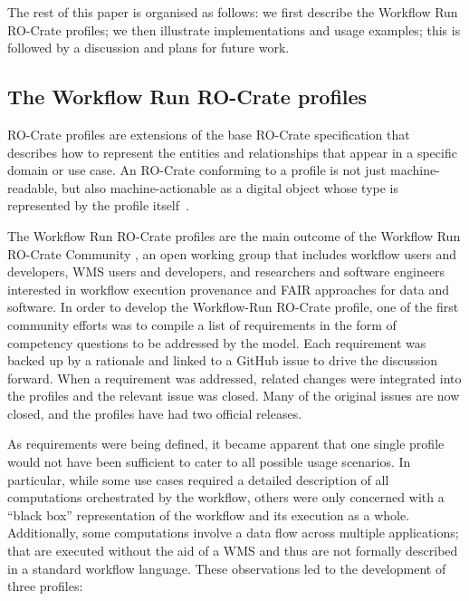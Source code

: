 The rest of this paper is organised as follows: we first describe the Workflow Run RO-Crate profiles; we then illustrate implementations and usage examples; this is followed by a discussion and plans for future work.


\subsection{The Workflow Run RO-Crate profiles}\label{ch54:the-workflow-run-ro-crate-profiles}

RO-Crate profiles are extensions of the base RO-Crate specification that describes how to represent the entities and relationships that appear in a specific domain or use case.
An RO-Crate conforming to a profile is not just machine-readable, but also machine-actionable as a digital object whose type is represented by the profile itself~\cite{10.3897/rio.8.e93937}.

The Workflow Run RO-Crate profiles are the main outcome of the Workflow Run RO-Crate Community , an open working group that includes workflow users and developers, WMS users and developers, and researchers and software engineers interested in workflow execution provenance and FAIR approaches for data and software.
In order to develop the Workflow-Run RO-Crate profile, one of the first community efforts was to compile a list of requirements in the form of competency questions  to be addressed by the model.
Each requirement was backed up by a rationale and linked to a GitHub issue to drive the discussion forward. When a requirement was addressed, related changes were integrated into the profiles and the relevant issue was closed. Many of the original issues are now closed, and the profiles have had two official releases.


As requirements were being defined, it became apparent that one single profile would not have been sufficient to cater to all possible usage scenarios.
In particular, while some use cases required a detailed description of all computations orchestrated by the workflow, others were only concerned with a ``black box'' representation of the workflow and its execution as a whole.
Additionally, some computations involve a data flow across multiple applications; that are executed without the aid of a WMS and thus are not formally described in a standard workflow language.
These observations led to the development of three profiles: 

